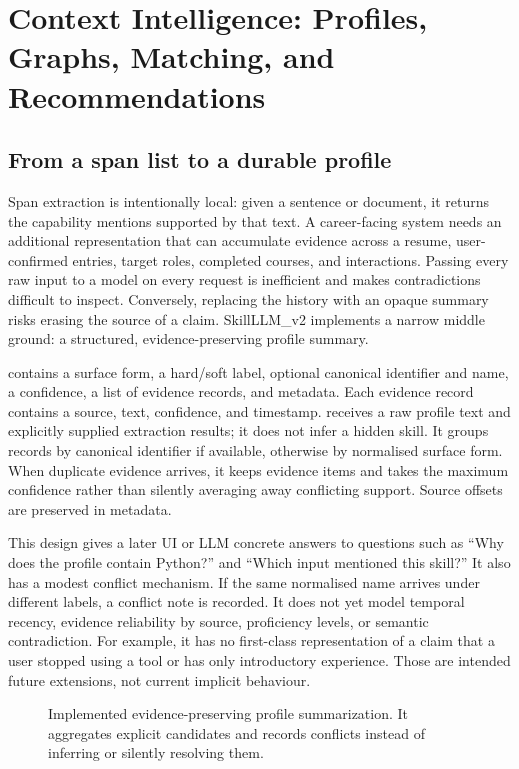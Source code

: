 \chapter{Context Intelligence: Profiles, Graphs, Matching, and Recommendations}
\label{ch:context}

\section{From a span list to a durable profile}

Span extraction is intentionally local: given a sentence or document, it returns the capability mentions supported by that text. A career-facing system needs an additional representation that can accumulate evidence across a resume, user-confirmed entries, target roles, completed courses, and interactions. Passing every raw input to a model on every request is inefficient and makes contradictions difficult to inspect. Conversely, replacing the history with an opaque summary risks erasing the source of a claim. SkillLLM\_v2 implements a narrow middle ground: a structured, evidence-preserving profile summary.

 contains a surface form, a hard/soft label, optional canonical identifier and name, a confidence, a list of evidence records, and metadata. Each evidence record contains a source, text, confidence, and timestamp.  receives a raw profile text and explicitly supplied extraction results; it does not infer a hidden skill. It groups records by canonical identifier if available, otherwise by normalised surface form. When duplicate evidence arrives, it keeps evidence items and takes the maximum confidence rather than silently averaging away conflicting support. Source offsets are preserved in metadata.

This design gives a later UI or LLM concrete answers to questions such as ``Why does the profile contain Python?'' and ``Which input mentioned this skill?'' It also has a modest conflict mechanism. If the same normalised name arrives under different labels, a conflict note is recorded. It does not yet model temporal recency, evidence reliability by source, proficiency levels, or semantic contradiction. For example, it has no first-class representation of a claim that a user stopped using a tool or has only introductory experience. Those are intended future extensions, not current implicit behaviour.

\begin{figure}[H]
\centering

\caption{Implemented evidence-preserving profile summarization. It aggregates explicit candidates and records conflicts instead of inferring or silently resolving them.}
\label{fig:profile}
\end{figure}

